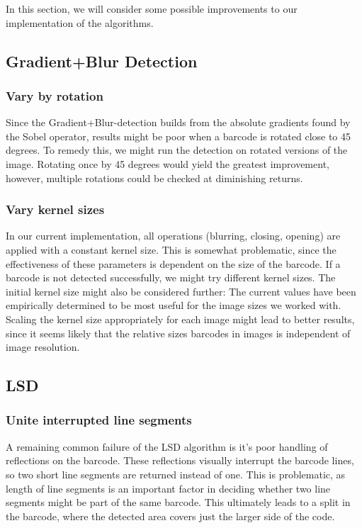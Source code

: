 In this section, we will consider some possible improvements to our implementation of the algorithms.

\subsection{Gradient+Blur Detection}

\subsubsection*{Vary by rotation}
Since the Gradient+Blur-detection builds from the absolute gradients found by the Sobel operator, results might be poor when a barcode is rotated close to 45 degrees. To remedy this, we might run the detection on rotated versions of the image. Rotating once by 45 degrees would yield the greatest improvement, however, multiple rotations could be checked at diminishing returns.

\subsubsection*{Vary kernel sizes}
In our current implementation, all operations (blurring, closing, opening) are applied with a constant kernel size. This is somewhat problematic, since the effectiveness of these parameters is dependent on the size of the barcode. If a barcode is not detected successfully, we might try different kernel sizes.\newline
The initial kernel size might also be considered further: The current values have been empirically determined to be most useful for the image sizes we worked with. Scaling the kernel size appropriately for each image might lead to better results, since it seems likely that the relative sizes barcodes in images is independent of image resolution.


\subsection{LSD}
\subsubsection*{Unite interrupted line segments}

A remaining common failure of the LSD algorithm is it's poor handling of reflections on the barcode. These reflections visually interrupt the barcode lines, so two short line segments are returned instead of one. This is problematic, as length of line segments is an important factor in deciding whether two line segments might be part of the same barcode. This ultimately leads to a split in the barcode, where the detected area covers just the larger side of the code.

